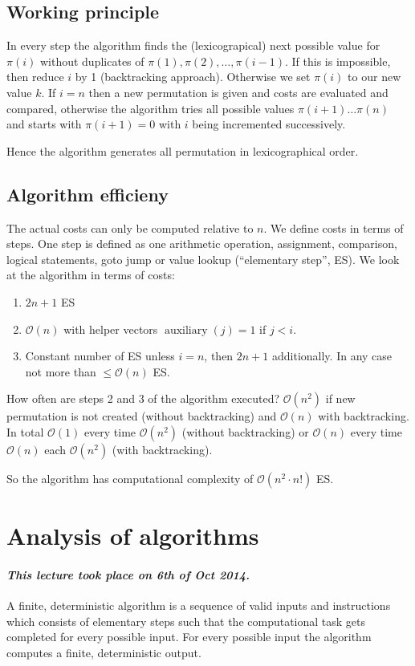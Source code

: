 \documentclass{article}
\newcommand{\dateref}[1]{\paragraph{\textit{This lecture took place on #1.}}}
\begin{document}
\subsection{Working principle}
%
In every step the algorithm finds the (lexicograpical) next possible value for $\pi(i)$ without duplicates of $\pi(1), \pi(2), \ldots, \pi(i-1)$. If this is impossible, then reduce $i$ by 1 (backtracking approach). Otherwise we set $\pi(i)$ to our new value $k$. If $i = n$ then a new permutation is given and costs are evaluated and compared, otherwise the algorithm tries all possible values $\pi(i+1)\ldots \pi(n)$ and starts with $\pi(i+1) = 0$ with $i$ being incremented successively.

Hence the algorithm generates all permutation in lexicographical order.

\subsection{Algorithm efficieny}
%
The actual costs can only be computed relative to $n$. We define costs in terms of steps. One step is defined as one arithmetic operation, assignment, comparison, logical statements, goto jump or value lookup (``elementary step'', ES). We look at the algorithm in terms of costs:

\begin{enumerate}
  \item $2n + 1$ ES
  \item $\mathcal{O}(n)$ with helper vectors $\operatorname{auxiliary}(j) = 1$ if $j < i$.
  \item Constant number of ES unless $i=n$, then $2n + 1$ additionally. In any case not more than $\leq \mathcal{O}(n)$ ES.
\end{enumerate}

How often are steps 2 and 3 of the algorithm executed? $\mathcal{O}(n^2)$ if new permutation is not created (without backtracking) and $\mathcal{O}(n)$ with backtracking. In total $\mathcal{O}(1)$ every time $\mathcal{O}(n^2)$ (without backtracking) or $\mathcal{O}(n)$ every time $\mathcal{O}(n)$ each $\mathcal{O}(n^2)$ (with backtracking).

So the algorithm has computational complexity of $\mathcal{O}(n^2 \cdot n!)$ ES.

\section{Analysis of algorithms}
\dateref{6th of Oct 2014}
%
A finite, deterministic algorithm is a sequence of valid inputs and instructions which consists of elementary steps such that the computational task gets completed for every possible input. For every possible input the algorithm computes a finite, deterministic output.
\end{document}
